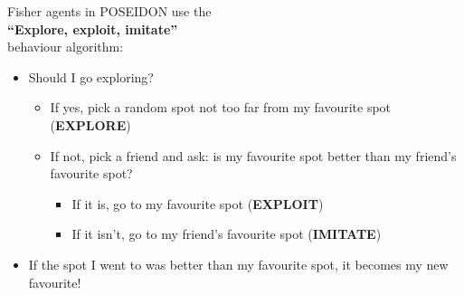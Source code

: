 \documentclass[table, 14pt, aspectratio=169]{beamer}
\newcommand{\hl}[1]{\textcolor{OxfordBlue}{\textbf{#1}}}
\begin{document}
\begin{frame}[t]
  \Large Fisher agents in POSEIDON use the\\\hl{``Explore, exploit, imitate''}\\behaviour algorithm:
  \vfill
  \begin{tcolorbox}[halign=flush left]
  \begin{itemize}\small
    \item Should I go exploring?
    \begin{itemize}\small
      \item If yes, pick a random spot not too far from my favourite spot (\hl{EXPLORE})
      \item If not, pick a friend and ask: is my favourite spot better than my friend's favourite spot?
      \begin{itemize}\small
        \item If it is, go to my favourite spot (\hl{EXPLOIT})
        \item If it isn't, go to my friend's favourite spot (\hl{IMITATE})
      \end{itemize}
    \end{itemize}
    \item If the spot I went to was better than my favourite spot, it becomes my new favourite!
  \end{itemize}
  \end{tcolorbox}
\end{frame}
\end{document}
